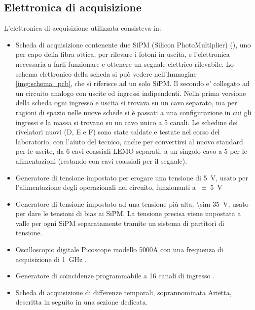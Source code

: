 \subsection{Elettronica di acquisizione}

L'elettronica di acquisizione utilizzata consisteva in:
\begin{itemize}
\item Scheda di acquisizione contenente due SiPM (Silicon PhotoMultiplier) (\cite{bib:SiPM}), uno per capo della fibra ottica, per rilevare i fotoni in uscita, e l'elettronica necessaria a farli funzionare e ottenere un segnale elettrico rilevabile. 
Lo schema elettronico della scheda si pu\`o vedere nell'Immagine \ref{img:schema_pcb}, che si riferisce ad un solo SiPM. 
Il secondo e' collegato ad un circuito analogo con uscite ed ingressi indipendenti. 
Nella prima versione della scheda ogni ingresso e uscita si trovava su un cavo separato, ma per ragioni di spazio nelle nuove schede si \`e passati a una configurazione in cui gli ingressi e la massa si trovano su un cavo unico a 5 canali.
Le schedine dei rivelatori nuovi (D, E e F) sono state saldate e testate nel corso del laboratorio, con l'aiuto del tecnico, anche per convertirsi al nuovo standard per le uscite, da 6 cavi coassiali LEMO separati, a un singolo cavo a 5 per le alimentazioni (restando con cavi coassiali per il segnale).


\item Generatore di tensione impostato per erogare una tensione di \SI{5}{\volt}, usato per l'alimentazione degli operazionali nel circuito, funzionanti a \SI{+-5}{\volt}

\item Generatore di tensione impostato ad una tensione pi\`u alta, \SI{\sim 35}{\volt}, usato per dare le tensioni di bias ai SiPM. La tensione precisa viene impostata a valle per ogni SiPM separatamente tramite un sistema di partitori di tensione.

\item Oscilloscopio digitale Picoscope modello 5000A con una frequenza di acquisizione di \SI{1}{\GHz} \cite{bib:datasheet_pico}.

\item Generatore di coincidenze programmabile a 16 canali di ingresso \cite{bib:articolo_garfa}.

\item Scheda di acquisizione di differenze temporali, soprannominata Arietta, descritta in seguito in una  sezione dedicata.

\end{itemize}

